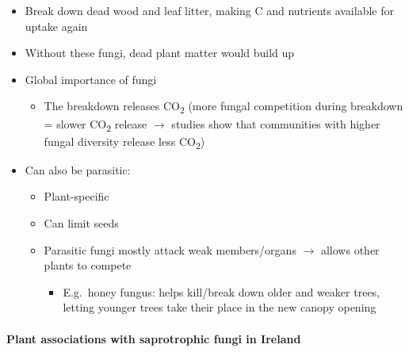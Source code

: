 \begin{itemize}
  \item Break down dead wood and leaf litter, making C and nutrients available for uptake again
  \item Without these fungi, dead plant matter would build up
  \item Global importance of fungi
  \begin{itemize}
    \item The breakdown releases CO\textsubscript{2} (more fungal competition during breakdown = slower CO\textsubscript{2} release $\rightarrow$ studies show that communities with higher fungal diversity release less CO\textsubscript{2})
  \end{itemize}
  \item Can also be parasitic:
  \begin{itemize}
    \item Plant-specific
    \item Can limit seeds
    \item Parasitic fungi mostly attack weak members/organs $\rightarrow$ allows other plants to compete
    \begin{itemize}
      \item E.g.\ honey fungus: helps kill/break down older and weaker trees, letting younger trees take their place in the new canopy opening
    \end{itemize}
  \end{itemize}
\end{itemize}

\paragraph{Plant associations with saprotrophic fungi in Ireland}\mbox{}

